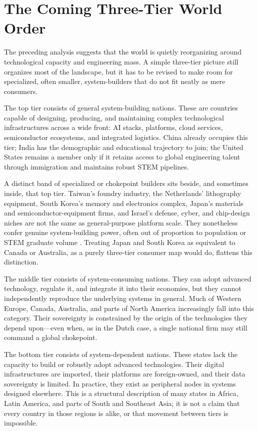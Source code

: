 \documentclass[12pt,letterpaper]{article}
\begin{document}
\FloatBarrier

\section{The Coming Three-Tier World Order}
\label{sec:tiers}

The preceding analysis suggests that the world is quietly reorganizing around technological capacity and engineering mass. A simple three-tier picture still organizes most of the landscape, but it has to be revised to make room for specialized, often smaller, system-builders that do not fit neatly as mere consumers.

The top tier consists of general system-building nations. These are countries capable of designing, producing, and maintaining complex technological infrastructures across a wide front: AI stacks, platforms, cloud services, semiconductor ecosystems, and integrated logistics. China already occupies this tier; India has the demographic and educational trajectory to join; the United States remains a member only if it retains access to global engineering talent through immigration and maintains robust STEM pipelines.

A distinct band of specialized or chokepoint builders sits beside, and sometimes inside, that top tier. Taiwan's foundry industry, the Netherlands' lithography equipment, South Korea's memory and electronics complex, Japan's materials and semiconductor-equipment firms, and Israel's defense, cyber, and chip-design niches are not the same as general-purpose platform scale. They nonetheless confer genuine system-building power, often out of proportion to population or STEM graduate volume \cite{miller2022}. Treating Japan and South Korea as equivalent to Canada or Australia, as a purely three-tier consumer map would do, flattens this distinction.

The middle tier consists of system-consuming nations. They can adopt advanced technology, regulate it, and integrate it into their economies, but they cannot independently reproduce the underlying systems in general. Much of Western Europe, Canada, Australia, and parts of North America increasingly fall into this category. Their sovereignty is constrained by the origin of the technologies they depend upon---even when, as in the Dutch case, a single national firm may still command a global chokepoint.

The bottom tier consists of system-dependent nations. These states lack the capacity to build or robustly adopt advanced technologies. Their digital infrastructures are imported, their platforms are foreign-owned, and their data sovereignty is limited. In practice, they exist as peripheral nodes in systems designed elsewhere. This is a structural description of many states in Africa, Latin America, and parts of South and Southeast Asia; it is not a claim that every country in those regions is alike, or that movement between tiers is impossible.
\end{document}
